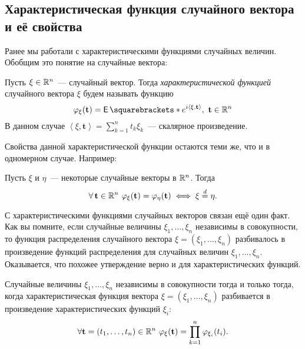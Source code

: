\subsection{Характеристическая функция случайного вектора и её свойства}
Ранее мы работали с характеристическими функциями случайных величин. Обобщим 
это понятие на случайные вектора:
\begin{definition}
	Пусть \(\xi \in \mathbb{R}^n\)~--- случайный вектор. Тогда \emph{характеристической 
	функцией} случайного вектора \(\xi\) будем называть функцию
	\[
		\phi_{\xi}(\mathbf{t}) = \E{e^{i\left\langle\xi, 
		\mathbf{t}\right\rangle}},\ \mathbf{t} \in \R^n
	\]
	В данном случае \(\left\langle\xi, \mathbf{t}\right\rangle = \sum_{k = 
	1}^{n} t_k\xi_k\)~--- скалярное произведение.
\end{definition}
Свойства данной характеристической функции остаются теми же, что и в одномерном 
случае. Например:
\begin{theorem}[единственности]
	Пусть \(\xi\) и \(\eta\)~--- некоторые случайные векторы в \(\mathbb{R}^n\). Тогда
	\[
		\forall\,\mathbf{t} \in \R^n\ \phi_{\xi}(\mathbf{t}) = 
		\phi_{\eta}(\mathbf{t}) \iff \xi \eqdist \eta.
	\]
\end{theorem}
С характеристическими функциями случайных векторов связан ещё один факт. Как вы 
помните, если случайные величины \(\xi_{1}, \dots, \xi_{n}\) независимы в 
совокупности, то функция распределения случайного вектора \(\xi = (\xi_1, 
\dots, \xi_n)\) разбивалось в произведение функций распределения для случайных 
величин \(\xi_{1}, \dots, \xi_{n}\). Оказывается, что похожее утверждение верно 
и для характеристических функций.
\begin{theorem}
	Случайные величины \(\xi_{1}, \dots, \xi_{n}\) независимы в совокупности 
	тогда и только тогда, когда характеристическая функция вектора \(\xi = 
	(\xi_{1}, \dots, \xi_{n})\) разбивается в произведение характеристических 
	функций \(\xi_{i}\):
	\[
		\forall \mathbf{t} = (t_1, \dots, t_n) \in \mathbb{R}^n\ \varphi_{\xi}(\mathbf{t}) 
		= \prod_{k = 1}^{n} \varphi_{\xi_i}(t_i).
	\]
\end{theorem}
